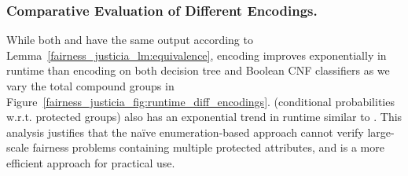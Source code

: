 \subsubsection{Comparative Evaluation of Different Encodings.}
While both {\justiciaenum} and {\justicialearn}  have the same output according to Lemma~\ref{fairness_justicia_lm:equivalence},  {\justicialearn} encoding  improves exponentially  in runtime  than {\justiciaenum} encoding on both decision tree and Boolean CNF classifiers as we vary the total compound groups in Figure~\ref{fairness_justicia_fig:runtime_diff_encodings}. {\justiciacond} (conditional probabilities w.r.t. protected groups) also has an exponential trend in runtime similar to {\justiciaenum}.  This analysis justifies that the na\"ive enumeration-based approach cannot verify large-scale fairness problems containing multiple protected attributes, and {\justicialearn} is a more efficient approach for practical use.









